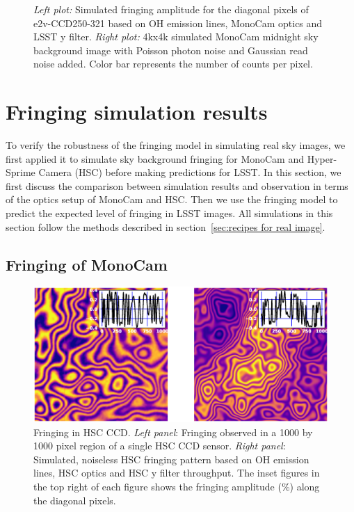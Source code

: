 \documentclass[twocolumn]{aastex63} %
\begin{document}
\begin{CJK*}{UTF8}{gbsn}
\begin{figure}[thb] 

\centering
{}
\caption{{\it Left plot:} Simulated fringing amplitude for the diagonal pixels of e2v-CCD250-321 based on OH emission lines, MonoCam optics and LSST y filter. {\it Right plot:} 4kx4k simulated MonoCam midnight sky background image with Poisson photon noise and Gaussian read noise added. Color bar represents the number of counts per pixel.}
\label{fig:MonoCam_sims}
\end{figure}


\section{Fringing simulation results} \label{sec:real_sky}
To verify the robustness of the fringing model in simulating real sky images, we first applied it to simulate sky background fringing for MonoCam \citep{Brooks17} and Hyper-Sprime Camera (HSC) \citep{Miyazaki18} before making predictions for LSST. In this section, we first discuss the comparison between simulation results and observation in terms of the optics setup of MonoCam and HSC. Then we use the fringing model to predict the expected level of fringing in LSST images. All simulations in this section follow the methods described in section~\ref{sec:recipes for real image}.



\subsection{Fringing of MonoCam} \label{sec: MonoCam sim}


\begin{figure}[bt]
\centering
\includegraphics[scale = 0.5]{HSC-data-sim.eps}
\caption{Fringing in HSC CCD. {\it Left panel}: Fringing observed in a 1000 by 1000 pixel region of a single HSC CCD sensor. {\it Right panel}: Simulated, noiseless HSC fringing pattern based on OH emission lines, HSC optics and HSC y filter throughput. The inset figures in the top right of each figure shows the fringing amplitude ($\%$) along the diagonal pixels.}
\label{fig:HSC_sims}
\end{figure}


\end{CJK*}
\end{document}
